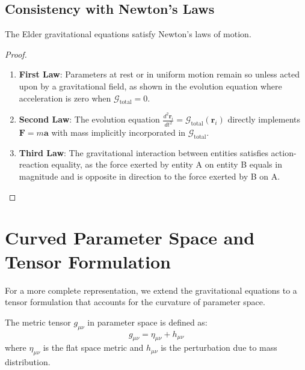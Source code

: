 \subsection{Consistency with Newton's Laws}

\begin{theorem}
The Elder gravitational equations satisfy Newton's laws of motion.
\end{theorem}

\begin{proof}
\begin{enumerate}
    \item \textbf{First Law}: Parameters at rest or in uniform motion remain so unless acted upon by a gravitational field, as shown in the evolution equation where acceleration is zero when $\mathcal{G}_{\text{total}} = 0$.
    
    \item \textbf{Second Law}: The evolution equation $\frac{d^2\mathbf{r}_i}{dt^2} = \mathcal{G}_{\text{total}}(\mathbf{r}_i)$ directly implements $\mathbf{F} = m\mathbf{a}$ with mass implicitly incorporated in $\mathcal{G}_{\text{total}}$.
    
    \item \textbf{Third Law}: The gravitational interaction between entities satisfies action-reaction equality, as the force exerted by entity A on entity B equals in magnitude and is opposite in direction to the force exerted by B on A.
\end{enumerate}
\end{proof}

\section{Curved Parameter Space and Tensor Formulation}

For a more complete representation, we extend the gravitational equations to a tensor formulation that accounts for the curvature of parameter space.

\begin{definition}
The metric tensor $g_{\mu\nu}$ in parameter space is defined as:
\begin{equation}
g_{\mu\nu} = \eta_{\mu\nu} + h_{\mu\nu}
\end{equation}
where $\eta_{\mu\nu}$ is the flat space metric and $h_{\mu\nu}$ is the perturbation due to mass distribution.
\end{definition}

